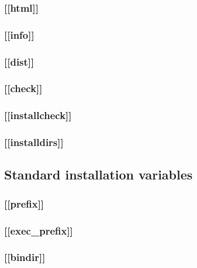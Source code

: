 \documentclass{article}
\begin{document}
\subsubsection{[[html]]}
\label{sec:general-structure:std-targets:html}

\subsubsection{[[info]]}
\label{sec:general-structure:std-targets:info}


\subsubsection{[[dist]]}
\label{sec:general-structure:std-targets:dist}

\subsubsection{[[check]]}
\label{sec:general-structure:std-targets:check}

\subsubsection{[[installcheck]]}
\label{sec:general-structure:std-targets:installcheck}

\subsubsection{[[installdirs]]}
\label{sec:general-structure:std-targets:installdirs}



\subsection{Standard installation variables}
\label{sec:general-structure:std-install}

\subsubsection{[[prefix]]}
\label{sec:general-structure:std-vars:prefix}

\subsubsection{[[exec_prefix]]}
\label{sec:general-structure:std-vars:exec-prefix}

\subsubsection{[[bindir]]}
\label{sec:general-structure:std-vars:bindir}
\end{document}
